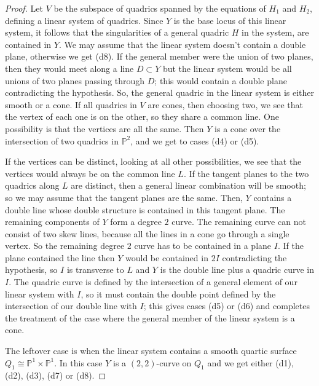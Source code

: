 \documentclass{amsart}
\theoremstyle{plain}
\numberwithin{equation}{section}
\begin{document}
\begin{proof}
Let $V$ be the subspace of quadrics spanned by the equations of 
$H_1$ and $H_2$, defining a linear system of quadrics. Since $Y$ is the base locus
of this linear system, it follows that the singularities of a general quadric $H$ in the 
system, are contained in $Y$. We may assume that the linear system doesn't
contain a double plane, otherwise we get (d8). If the general member were the union of two planes, then they
would meet along a line $D\subset Y$ but the linear system would be all unions of two planes
passing through $D$; this would contain a double plane contradicting the hypothesis.
So, the general quadric in the linear system is either smooth or a cone. If all quadrics in
$V$ are cones, then choosing two, we see that the vertex of each one is on the other,
so they share a common line. One possibility is that the vertices are all the same.
Then $Y$ is a cone over the intersection of two quadrics in ${{\mathbb P}} ^2$, and we get
to cases (d4) or (d5). 

If the vertices can be distinct, 
looking at all other possibilities, we see that the vertices would
always be on the common line $L$. If the tangent planes to the two quadrics along $L$ are distinct, then a general linear combination will be smooth; so we may assume that the
tangent planes are the same. Then, $Y$ contains a double line whose double structure is contained in this tangent plane. The remaining components of $Y$ form a degree $2$ curve.
The remaining curve can not consist of two skew lines, because all the lines in a cone
go through a single vertex. So the remaining degree $2$ curve has to be 
contained in a plane $I$. If the plane contained the line then $Y$ would
be contained in $2I$ contradicting the hypothesis, so $I$ is transverse to $L$
and $Y$ is the double line plus a quadric curve in $I$. The quadric curve is defined by
the intersection of a general element of our linear system with $I$, so it must contain
the double point defined by the intersection of our double line with $I$; this gives
cases (d5) or (d6) and completes the treatment of the case where the general member
of the linear system is a cone.

The leftover case is when the linear system contains a smooth quartic surface
$Q_1\cong{{\mathbb P}} ^1\times {{\mathbb P}} ^1$. In this case $Y$ is a $(2,2)$-curve on $Q_1$ and
we get either (d1), (d2), (d3), (d7)  or (d8).
\end{proof}
\end{document}
